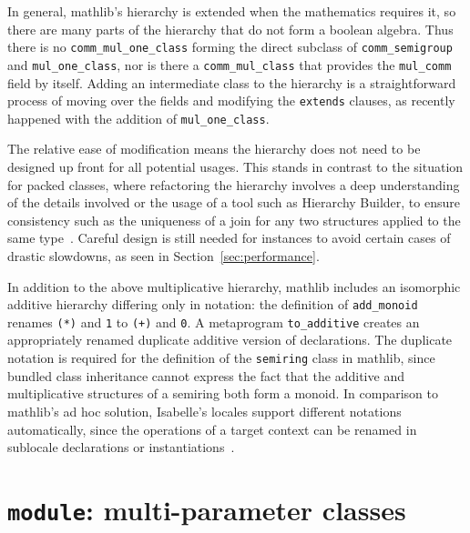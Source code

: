 \documentclass[a4paper,UKenglish,cleveref, autoref, thm-restate]{lipics-v2021}
\newcommand{\mathlib}{\textsf{mathlib}\xspace}
\begin{document}
In general, \mathlib's hierarchy is extended when the mathematics requires it,
so there are many parts of the hierarchy that do not form a boolean algebra.
Thus there is no \lstinline{comm_mul_one_class} forming the direct subclass of \lstinline{comm_semigroup} and \mbox{\lstinline{mul_one_class},}
nor is there a \lstinline{comm_mul_class} that provides the \lstinline{mul_comm} field by itself.
Adding an intermediate class to the hierarchy is a straightforward process of moving over the fields and modifying the \lstinline{extends} clauses,
as recently happened with the addition of \lstinline{mul_one_class}.%

The relative ease of modification means the hierarchy does not need to be designed up front for all potential usages.
This stands in contrast to the situation for packed classes, where refactoring the hierarchy involves a deep understanding of the details involved or the usage of a tool such as Hierarchy Builder,
to ensure consistency such as the uniqueness of a join for any two structures applied to the same type~\cite{Coq-Validating-Mathematical-Structures}.
Careful design is still needed for instances to avoid certain cases of drastic slowdowns, as seen in Section~\ref{sec:performance}.

In addition to the above multiplicative hierarchy, \mathlib includes an isomorphic additive hierarchy differing only in notation:
the definition of \lstinline{add_monoid} renames \lstinline{(*)} and \lstinline{1} to \lstinline{(+)} and \lstinline{0}.
A metaprogram \lstinline{to_additive} creates an appropriately renamed duplicate additive version of declarations.
The duplicate notation is required for the definition of the \lstinline{semiring} class in \mathlib,
since bundled class inheritance cannot express the fact that the additive and multiplicative structures of a semiring both form a monoid.
In comparison to \mathlib's ad hoc solution, Isabelle's locales support different notations automatically, since the operations of a target context can be renamed in sublocale declarations or instantiations~\cite{ballarin-locales-algebra}.

\section{\lstinline{module}: multi-parameter classes} \label{sec:module-and-vector-space} \label{sec:multiparam}
\end{document}
